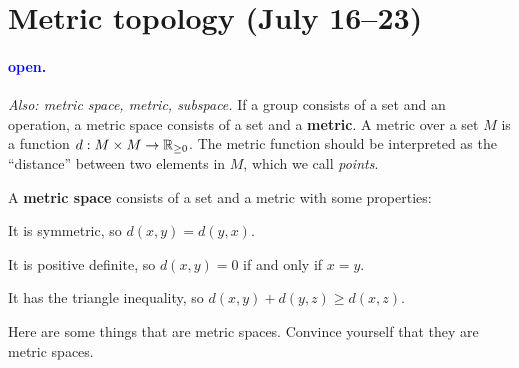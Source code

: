 \documentclass[11pt,paper=letter]{scrartcl}
\renewcommand\wp[1]{\paragraph{\textcolor{Blue}{#1.}} \hspace{-1em}}
\newcommand\wl[1]{\label{w:#1}}
\newcommand\oww[1]{\textit{Also: #1.}}
\begin{document}
\section{Metric topology (July 16--23)}

\wp{open}
\wl{open}
\oww{metric space, metric, subspace}
If a group consists of a set and an operation, a metric space consists of a set and a \textbf{metric}. A metric over a set $M$ is a function $d : M \times M \to \mathbb R_{\geq 0} $. The metric function should be interpreted as the ``distance'' between two elements in $M$, which we call \textit{points}.

A \textbf{metric space} consists of a set and a metric with some properties:

\begin{itemthin}
  \item It is symmetric, so $d(x, y) = d(y ,x)$.
  \item It is positive definite, so $d(x, y) = 0$ if and only if $x = y$.
  \item It has the triangle inequality, so $d(x, y) + d(y, z) \ge d(x, z)$.
\end{itemthin}

Here are some things that are metric spaces. Convince yourself that they are metric spaces.
\end{document}
